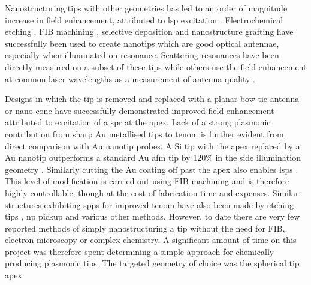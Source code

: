 \documentclass{article}
\begin{document}
Nanostructuring tips with other geometries has led to an order of magnitude increase in field enhancement, attributed to \gls{lsp} excitation \cite{umakoshi2012}. Electrochemical etching \cite{kharintsev2013}, FIB machining \cite{maouli2015}, selective deposition \cite{zou2009} and nanostructure grafting \cite{huth2013} have successfully been used to create nanotips which are good optical antennae, especially when illuminated on resonance. Scattering resonances have been directly measured on a subset of these tips \cite{zou2009, maouli2015} while others use the field enhancement at common laser wavelengths as a measurement of antenna quality \cite{huth2013, kharintsev2013}.

Designs in which the tip is removed and replaced with a planar bow-tie antenna \cite{weber2010} or nano-cone \cite{fleischer2011} have successfully demonstrated improved field enhancement attributed to excitation of a \gls{spr} at the apex. Lack of a strong plasmonic contribution from sharp Au metallised tips to \gls{tenom} is further evident from direct comparison with Au nanotip probes. A Si tip with the apex replaced by a Au nanotip outperforms a standard Au \gls{afm} tip by 120\% in the side illumination geometry \cite{huth2013}. Similarly cutting the Au coating off past the apex also enables \glspl{lsp} \cite{zou2009}. This level of modification is carried out using FIB machining and is therefore highly controllable, though at the cost of fabrication time and expenses.
Similar structures exhibiting \glspl{spp} for improved \gls{tenom} have also been made by etching tips \cite{uebel2013, kharintsev2013}, \gls{np} pickup \cite{denisyuk2012} and various other methods. %
However, to date there are very few reported methods of simply nanostructuring a tip without the need for FIB, electron microscopy or complex chemistry. A significant amount of time on this project was therefore spent determining a simple approach for chemically producing plasmonic tips. The targeted geometry of choice was the spherical tip apex.
\end{document}
